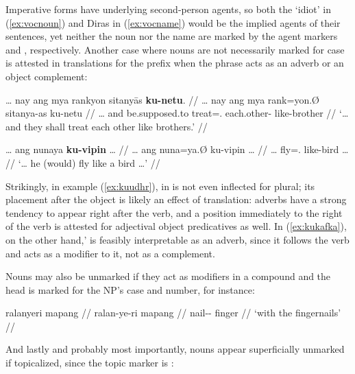 Imperative forms have underlying second-person agents, so both the `idiot' in
(\ref{ex:vocnoun}) and Diras in (\ref{ex:vocname}) would be the implied agents
of their sentences, yet neither the noun nor the name are marked by the agent
markers  and , respectively. Another case where
nouns are not necessarily marked for case is attested in translations for the
prefix  when the phrase acts as an adverb or an
object complement:

\pex
\a\label{ex:kuudhr}\begingl
	\gla … nay ang mya rankyon sitanyās \textbf{ku-netu}. //
	\glb … nay ang mya rank=yon.Ø sitanya-as ku-netu //
	\glc … and \AgtT{} be.supposed.to treat=\TplN{}.\Top{} 
		each.other-\Parg{} like-brother //
	\glft `… and they shall treat each other like brothers.'\footnotemark%
	//
\endgl

\a\label{ex:kukafka}\begingl
	\gla … ang nunaya \textbf{ku-vipin} … //
	\glb … ang nuna=ya.Ø ku-vipin … //
	\glc … \AgtT{} fly=\TsgM{}.\Top{} like-bird … //
	\glft `… he (would) fly like a bird …'%
	//
\endgl

\xe


Strikingly, in example (\ref{ex:kuudhr}),  in
 is not even inflected for plural; its 
placement after the object is likely an effect of translation: adverbs have a
strong tendency to appear right after the verb, and a position immediately to
the right of the verb is attested for adjectival object predicatives as well.
In (\ref{ex:kukafka}), on the other hand,'  is feasibly interpretable as an adverb, since it follows the verb and
acts as a modifier to it, not as a complement.

Nouns may also be unmarked if they act as modifiers in a compound and the head 
is marked for the NP's case and number, for instance:

\ex\begingl
	\gla ralanyeri mapang //
	\glb ralan-ye-ri mapang //
	\glc nail-\Pl{}-\Ins{} finger //
	\glft `with the fingernails' //
\endgl\xe

And lastly and probably most importantly, nouns appear superficially unmarked 
if topicalized, since the topic marker is :

